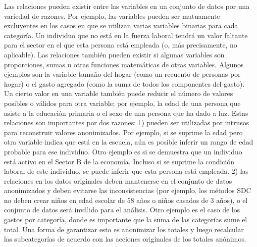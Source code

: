 \documentclass[
]{book}
\theoremstyle{definition}
\theoremstyle{definition}
\theoremstyle{definition}
\theoremstyle{definition}
\theoremstyle{remark}
\begin{document}
Las relaciones pueden existir entre las variables en un conjunto de datos por una variedad de razones. Por ejemplo, las variables pueden ser mutuamente excluyentes en los casos en que se utilizan varias variables binarias para cada categoría. Un individuo que no está en la fuerza laboral tendrá un valor faltante para el sector en el que esta persona está empleada (o, más precisamente, no aplicable). Las relaciones también pueden existir si algunas variables son proporciones, sumas u otras funciones matemáticas de otras variables. Algunos ejemplos son la variable tamaño del hogar (como un recuento de personas por hogar) o el gasto agregado (como la suma de todos los componentes del gasto). Un cierto valor en una variable también puede reducir el número de valores posibles o válidos para otra variable; por ejemplo, la edad de una persona que asiste a la educación primaria o el sexo de una persona que ha dado a luz. Estas relaciones son importantes por dos razones: 1) pueden ser utilizadas por intrusos para reconstruir valores anonimizados. Por ejemplo, si se suprime la edad pero otra variable indica que está en la escuela, aún es posible inferir un rango de edad probable para ese individuo. Otro ejemplo es si se demuestra que un individuo está activo en el Sector B de la economía. Incluso si se suprime la condición laboral de este individuo, se puede inferir que esta persona está empleada. 2) las relaciones en los datos originales deben mantenerse en el conjunto de datos anonimizados y deben evitarse las inconsistencias (por ejemplo, los métodos SDC no deben crear niños en edad escolar de 58 años o niños casados de 3 años), o el conjunto de datos será inválido para el análisis. Otro ejemplo es el caso de los gastos por categoría, donde es importante que la suma de las categorías sume el total. Una forma de garantizar esto es anonimizar los totales y luego recalcular las subcategorías de acuerdo con las acciones originales de los totales anónimos.
\end{document}
